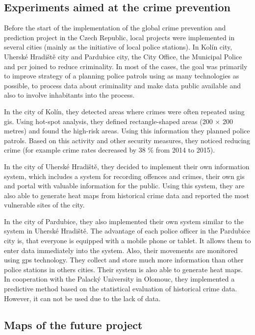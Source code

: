 \documentclass[thesis=M,english]{FITthesis}[2012/10/20]
\begin{document}
\subsection{Experiments aimed at the crime prevention}

Before the start of the implementation of the global crime prevention and prediction project in the Czech Republic, local projects were implemented in several cities (mainly as the initiative of local police stations). In Kolín city, Uherské Hradiště city and Pardubice city, the City Office, the Municipal Police and \gls{pcr} joined to reduce criminality. In most of the cases, the goal was primarily to improve strategy of a planning police patrols using as many technologies as possible, to process data about criminality and make data public available and also to involve inhabitants into the process.

In the city of Kolín, they detected areas where crimes were often repeated using \gls{gis}.\cite[105]{Hruska2015maps} Using hot-spot analysis, they defined rectangle-shaped areas (200 $\times$ 200 metres) and found the high-risk areas. Using this information they planned police patrols. Based on this activity and other security measures, they noticed reducing crime (for example crime rates decreased by 38 \% from 2014 to 2015).

In the city of Uherské Hradiště, they decided to implement their own information system, which includes a system for recording offences and crimes, their own \gls{gis} and portal with valuable information for the public. \cite[115]{Hruska2015maps} Using this system, they are also able to generate heat maps from historical crime data and reported the most vulnerable sites of the city.

In the city of Pardubice, they also implemented their own system similar to the system in Uherské Hradiště.\cite[124]{Hruska2015maps} The advantage of each police officer in the Pardubice city is, that everyone is equipped with a mobile phone or tablet. It allows them to enter data immediately into the system. Also, their movements are monitored using \gls{gps} technology. They collect and store much more information than other police stations in others cities. Their system is also able to generate heat maps. In cooperation with the Palacký University in Olomouc, they implemented a predictive method based on the statistical evaluation of historical crime data. However, it can not be used due to the lack of data.  

\subsection{Maps of the future project}
\end{document}
